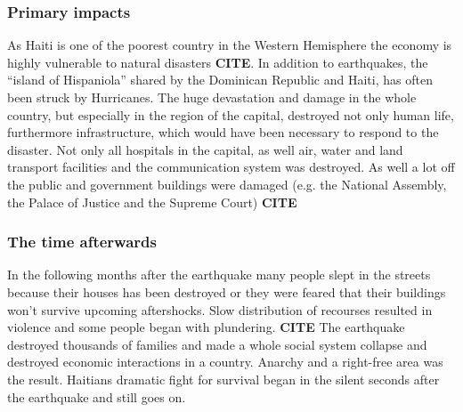 \documentclass[11pt]{article}
\begin{document}
\subsubsection*{Primary impacts}
As Haiti is one of the poorest country in the Western Hemisphere  the economy is highly vulnerable to natural disasters \textbf{CITE}. In addition to earthquakes, the “island of Hispaniola” shared by the Dominican Republic and Haiti, has often been struck by Hurricanes. 
\newline
The huge devastation and damage in the whole country, but especially in the region of the capital, destroyed not only human life, furthermore infrastructure, which would have been necessary to respond to the disaster. Not only all hospitals in the capital, as well air, water and land transport facilities and the communication system was destroyed. As well a lot off the public and government buildings were damaged (e.g. the National Assembly, the Palace of Justice and the Supreme Court) \textbf{CITE}


\subsubsection*{The time afterwards}

In the following months after the earthquake many people slept in the streets because their houses has been destroyed or they were feared that their buildings won’t survive upcoming aftershocks. Slow distribution of recourses resulted in violence and some people began with plundering. \textbf{CITE}
\newline
The earthquake destroyed thousands of families and made  a whole social system collapse and destroyed economic interactions in a country. Anarchy and a right-free area was the result. Haitians dramatic fight for survival began in the silent seconds after the earthquake and still goes on.
\end{document}
